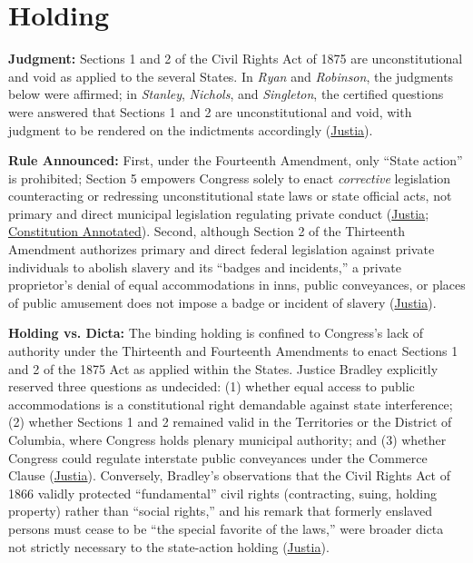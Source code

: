 \documentclass[12pt]{article}
\begin{document}
\section{Holding}

\textbf{Judgment:} Sections 1 and 2 of the Civil Rights Act of 1875 are unconstitutional and void as applied to the several States. In \textit{Ryan} and \textit{Robinson}, the judgments below were affirmed; in \textit{Stanley}, \textit{Nichols}, and \textit{Singleton}, the certified questions were answered that Sections 1 and 2 are unconstitutional and void, with judgment to be rendered on the indictments accordingly (\href{https://supreme.justia.com/cases/federal/us/109/3/}{Justia}).

\textbf{Rule Announced:} First, under the Fourteenth Amendment, only ``State action'' is prohibited; Section 5 empowers Congress solely to enact \textit{corrective} legislation counteracting or redressing unconstitutional state laws or state official acts, not primary and direct municipal legislation regulating private conduct (\href{https://supreme.justia.com/cases/federal/us/109/3/}{Justia}; \href{https://www.law.cornell.edu/constitution-conan/amendment-14/state-action-doctrine}{Constitution Annotated}). Second, although Section 2 of the Thirteenth Amendment authorizes primary and direct federal legislation against private individuals to abolish slavery and its ``badges and incidents,'' a private proprietor's denial of equal accommodations in inns, public conveyances, or places of public amusement does not impose a badge or incident of slavery (\href{https://supreme.justia.com/cases/federal/us/109/3/}{Justia}).

\textbf{Holding vs. Dicta:} The binding holding is confined to Congress's lack of authority under the Thirteenth and Fourteenth Amendments to enact Sections 1 and 2 of the 1875 Act as applied within the States. Justice Bradley explicitly reserved three questions as undecided: (1) whether equal access to public accommodations is a constitutional right demandable against state interference; (2) whether Sections 1 and 2 remained valid in the Territories or the District of Columbia, where Congress holds plenary municipal authority; and (3) whether Congress could regulate interstate public conveyances under the Commerce Clause (\href{https://supreme.justia.com/cases/federal/us/109/3/}{Justia}). Conversely, Bradley's observations that the Civil Rights Act of 1866 validly protected ``fundamental'' civil rights (contracting, suing, holding property) rather than ``social rights,'' and his remark that formerly enslaved persons must cease to be ``the special favorite of the laws,'' were broader dicta not strictly necessary to the state-action holding (\href{https://supreme.justia.com/cases/federal/us/109/3/}{Justia}).
\end{document}
